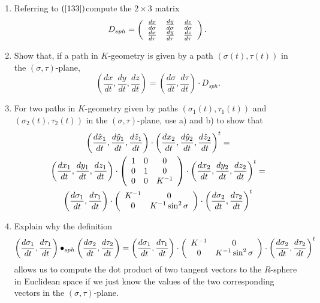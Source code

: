 \documentclass{ximera}
\begin{document}
\begin{exercise}
\label{3333} \begin{enumerate}
\item Referring to $\left(  \ref{133}\right)  $compute
the $2\times3$ matrix
\[
D_{sph}=\left(
\begin{array}
[c]{ccc}%
\frac{dx}{d\sigma} & \frac{dy}{d\sigma} & \frac{dz}{d\sigma}\\
\frac{dx}{d\tau} & \frac{dy}{d\tau} & \frac{dz}{d\tau}%
\end{array}
\right)  .
\]


\item  Show that, if a path in $K$-geometry is given by a path $\left(
\sigma\left(  t\right)  ,\tau\left(  t\right)  \right)  $ in the $\left(
\sigma,\tau\right)  $-plane,%
\[
\left(  \frac{dx}{dt},\frac{dy}{dt},\frac{dz}{dt}\right)  =\left(
\frac{d\sigma}{dt},\frac{d\tau}{dt}\right)  \cdot D_{sph}.
\]


\item For two paths in $K$-geometry given by paths $\left(  \sigma_{1}\left(
t\right)  ,\tau_{1}\left(  t\right)  \right)  $ and $\left(  \sigma_{2}\left(
t\right)  ,\tau_{2}\left(  t\right)  \right)  $ in the $\left(  \sigma
,\tau\right)  $-plane, use a) and b) to show that
\begin{gather*}
\left(  \frac{d\hat{x}_{1}}{dt},\frac{d\hat{y}_{1}}{dt},\frac{d\hat{z}_{1}%
}{dt}\right)  \cdot\left(  \frac{dx_{2}}{dt},\frac{d\hat{y}_{2}}{dt}%
,\frac{d\hat{z}_{2}}{dt}\right)  ^{t}=\\
\left(  \frac{dx_{1}}{dt},\frac{dy_{1}}{dt},\frac{dz_{1}}{dt}\right)
\cdot\left(
\begin{array}
[c]{ccc}%
1 & 0 & 0\\
0 & 1 & 0\\
0 & 0 & K^{-1}%
\end{array}
\right)  \cdot\left(  \frac{dx_{2}}{dt},\frac{dy_{2}}{dt},\frac{dz_{2}}%
{dt}\right)  ^{t}=\\
\left(  \frac{d\sigma_{1}}{dt},\frac{d\tau_{1}}{dt}\right)  \cdot\left(
\begin{array}
[c]{cc}%
K^{-1} & 0\\
0 & K^{-1}\sin^{2}\sigma
\end{array}
\right)  \cdot\left(  \frac{d\sigma_{2}}{dt},\frac{d\tau_{2}}{dt}\right)  ^{t}%
\end{gather*}

\item Explain why the definition%
\[
\left(  \frac{d\sigma_{1}}{dt},\frac{d\tau_{1}}{dt}\right)  \bullet
_{sph}\left(  \frac{d\sigma_{2}}{dt},\frac{d\tau_{2}}{dt}\right)  =\left(
\frac{d\sigma_{1}}{dt},\frac{d\tau_{1}}{dt}\right)  \cdot\left(
\begin{array}
[c]{cc}%
K^{-1} & 0\\
0 & K^{-1}\sin^{2}\sigma
\end{array}
\right)  \cdot\left(  \frac{d\sigma_{2}}{dt},\frac{d\tau_{2}}{dt}\right)  ^{t}%
\]
allows us to compute the dot product of two tangent vectors to the $R$-sphere
in Euclidean space if we just know the values of the two corresponding vectors
in the $\left(  \sigma,\tau\right)  $-plane.
\end{enumerate}
\end{exercise}
\end{document}
